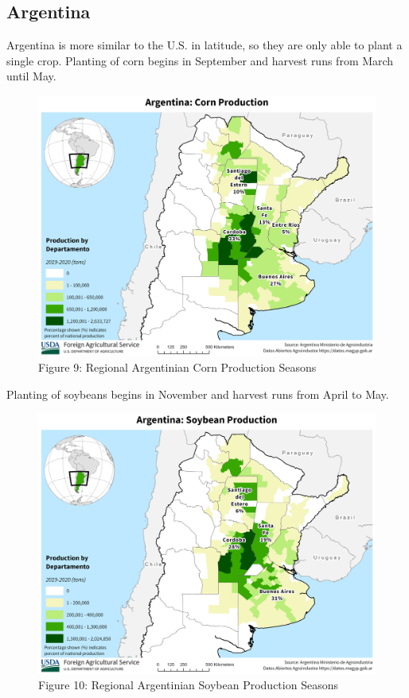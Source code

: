 \documentclass[
  letterpaper,
  DIV=11,
  numbers=noendperiod]{scrreprt}
\begin{document}
\subsection{Argentina}\label{argentina}

Argentina is more similar to the U.S. in latitude, so they are only able
to plant a single crop. Planting of corn begins in September and harvest
runs from March until May.

\begin{figure}[H]

{\centering \includegraphics{assets/Argentina_Departments_Corn.png}

}

\caption{Figure 9: Regional Argentinian Corn Production Seasons}

\end{figure}%

Planting of soybeans begins in November and harvest runs from April to
May.

\begin{figure}[H]

{\centering \includegraphics{assets/Argentina_Departments_Soybean.png}

}

\caption{Figure 10: Regional Argentinian Soybean Production Seasons}

\end{figure}%
\end{document}
